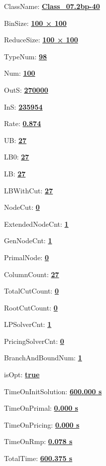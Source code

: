 \documentclass[11pt]{article}
\begin{document}
\pagestyle{empty}


ClassName: \underline{\textbf{Class_07.2bp-40}}
\par
BinSize: \underline{\textbf{100 × 100}}
\par
ReduceSize: \underline{\textbf{100 × 100}}
\par
TypeNum: \underline{\textbf{98}}
\par
Num: \underline{\textbf{100}}
\par
OutS: \underline{\textbf{270000}}
\par
InS: \underline{\textbf{235954}}
\par
Rate: \underline{\textbf{0.874}}
\par
UB: \underline{\textbf{27}}
\par
LB0: \underline{\textbf{27}}
\par
LB: \underline{\textbf{27}}
\par
LBWithCut: \underline{\textbf{27}}
\par
NodeCut: \underline{\textbf{0}}
\par
ExtendedNodeCnt: \underline{\textbf{1}}
\par
GenNodeCnt: \underline{\textbf{1}}
\par
PrimalNode: \underline{\textbf{0}}
\par
ColumnCount: \underline{\textbf{27}}
\par
TotalCutCount: \underline{\textbf{0}}
\par
RootCutCount: \underline{\textbf{0}}
\par
LPSolverCnt: \underline{\textbf{1}}
\par
PricingSolverCnt: \underline{\textbf{0}}
\par
BranchAndBoundNum: \underline{\textbf{1}}
\par
isOpt: \underline{\textbf{true}}
\par
TimeOnInitSolution: \underline{\textbf{600.000 s}}
\par
TimeOnPrimal: \underline{\textbf{0.000 s}}
\par
TimeOnPricing: \underline{\textbf{0.000 s}}
\par
TimeOnRmp: \underline{\textbf{0.078 s}}
\par
TotalTime: \underline{\textbf{600.375 s}}
\par
\newpage


\end{document}
